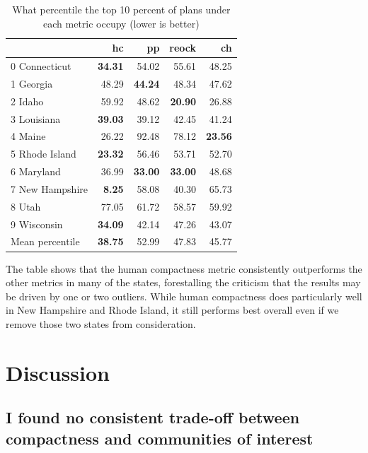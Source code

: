 \documentclass[]{article}
\begin{document}
\begin{table}[h!]
\begin{center}
\caption{What percentile the top 10 percent of plans under each metric occupy (lower is better)}
\label{table:top_plans_sd_percentile}
\begin{tabular}{@{\extracolsep{3pt}}lrrrr} 
\toprule
{} &     hc &     pp &  reock &     ch \\
\midrule
0 Connecticut &  \textbf{34.31} &  54.02 &  55.61 &  48.25 \\
1 Georgia &  48.29 &  \textbf{44.24} &  48.34 &  47.62 \\
2 Idaho &  59.92 &  48.62 &  \textbf{20.90} &  26.88 \\
3 Louisiana &  \textbf{39.03} &  39.12 &  42.45 &  41.24 \\
4 Maine &  26.22 &  92.48 &  78.12 &  \textbf{23.56} \\
5 Rhode Island &  \textbf{23.32} &  56.46 &  53.71 &  52.70 \\
6 Maryland &  36.99 &  \textbf{33.00} &  \textbf{33.00} &  48.68 \\
7 New Hampshire &   \textbf{8.25} &  58.08 &  40.30 &  65.73 \\
8 Utah &  77.05 &  61.72 &  58.57 &  59.92 \\
9 Wisconsin &  \textbf{34.09} &  42.14 &  47.26 &  43.07 \\
\bottomrule
Mean percentile & \textbf{38.75} &  52.99  &  47.83 &  45.77 \\
\bottomrule
\end{tabular}
\end{center}
\end{table}

The table shows that the human compactness metric consistently
outperforms the other metrics in many of the states, forestalling the
criticism that the results may be driven by one or two outliers. While
human compactness does particularly well in New Hampshire and Rhode
Island, it still performs best overall even if we remove those two
states from consideration.

\hypertarget{discussion}{%
\section{Discussion}\label{discussion}}

\hypertarget{i-found-no-consistent-trade-off-between-compactness-and-communities-of-interest}{%
\subsection{I found no consistent trade-off between compactness and
communities of
interest}\label{i-found-no-consistent-trade-off-between-compactness-and-communities-of-interest}}
\end{document}

